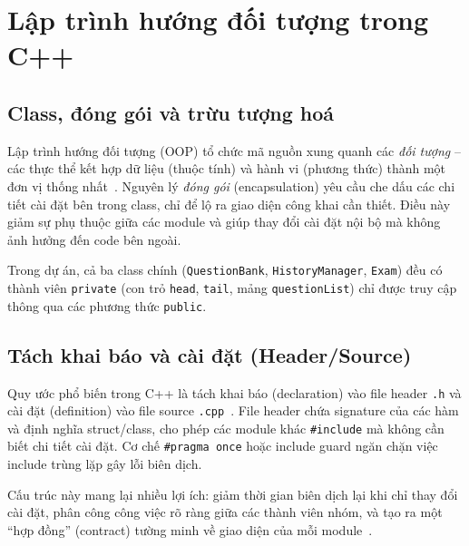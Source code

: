\documentclass[11pt]{report}
\begin{document}
\section{Lập trình hướng đối tượng trong C++}

\subsection{Class, đóng gói và trừu tượng hoá}

Lập trình hướng đối tượng (OOP) tổ chức mã nguồn xung quanh các \textit{đối tượng} -- các thực thể kết hợp dữ liệu (thuộc tính) và hành vi (phương thức) thành một đơn vị thống nhất~\cite{stroustrup2013}. Nguyên lý \textit{đóng gói} (encapsulation) yêu cầu che dấu các chi tiết cài đặt bên trong class, chỉ để lộ ra giao diện công khai cần thiết. Điều này giảm sự phụ thuộc giữa các module và giúp thay đổi cài đặt nội bộ mà không ảnh hưởng đến code bên ngoài.

Trong dự án, cả ba class chính (\texttt{QuestionBank}, \texttt{HistoryManager}, \texttt{Exam}) đều có thành viên \texttt{private} (con trỏ \texttt{head}, \texttt{tail}, mảng \texttt{questionList}) chỉ được truy cập thông qua các phương thức \texttt{public}.

\subsection{Tách khai báo và cài đặt (Header/Source)}

Quy ước phổ biến trong C++ là tách khai báo (declaration) vào file header \texttt{.h} và cài đặt (definition) vào file source \texttt{.cpp}~\cite{stroustrup2013}. File header chứa signature của các hàm và định nghĩa struct/class, cho phép các module khác \texttt{\#include} mà không cần biết chi tiết cài đặt. Cơ chế \texttt{\#pragma once} hoặc include guard ngăn chặn việc include trùng lặp gây lỗi biên dịch.

Cấu trúc này mang lại nhiều lợi ích: giảm thời gian biên dịch lại khi chỉ thay đổi cài đặt, phân công công việc rõ ràng giữa các thành viên nhóm, và tạo ra một ``hợp đồng'' (contract) tường minh về giao diện của mỗi module~\cite{stroustrup2013}.
\end{document}
